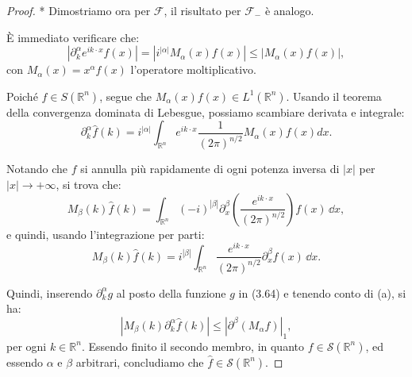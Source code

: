 \begin{proof} *     
Dimostriamo ora per $\mathcal{F}$, il risultato per $\mathcal{F}_{-}$ è analogo.

È immediato verificare che:
\begin{equation*}
    |\partial_k^\alpha e^{i k \cdot x} f(x)| = |i^{|\alpha|} M_\alpha(x) f(x)| \leq |M_\alpha(x) f(x)|,
\end{equation*}
con $M_\alpha(x) = x^\alpha f(x)$ l'operatore moltiplicativo. 

Poiché $f \in S(\mathbb{R}^n)$, segue che $M_\alpha(x) f(x) \in L^1(\mathbb{R}^n)$. Usando il teorema della convergenza dominata di Lebesgue, possiamo scambiare derivata e integrale:
\begin{equation*}
    \partial_k^\alpha \hat{f}(k) = i^{|\alpha|} \int_{\mathbb{R}^n} e^{i k \cdot x} \frac{1}{(2\pi)^{n/2}} M_\alpha(x) f(x) dx.
\end{equation*}


Notando che $f$ si annulla più rapidamente di ogni potenza inversa di $|x|$ per $|x| \to +\infty$, si trova che:
\begin{equation*}
M_{{\beta}}({k}) \hat{f}(k) = \int_{\mathbb{R}^n} (-i)^{|{\beta}|} \partial^{{\beta}}_{{x}} \left( \frac{e^{i{k} \cdot {x}}}{(2\pi)^{n/2}} \right) f({x}) \, \dd {x},
\end{equation*}
e quindi, usando l'integrazione per parti:
\begin{equation*}
M_{{\beta}}({k}) \hat{f}(k) = i^{|{\beta}|} \int_{\mathbb{R}^n} \frac{e^{i{k} \cdot {x}}}{(2\pi)^{n/2}} \partial^{{\beta}}_{{x}} f({x}) \, \dd {x}.
\end{equation*}

Quindi, inserendo $\partial^{{\alpha}}_{{k}} g$ al posto della funzione $g$ in (3.64) e tenendo conto di (a), si ha:
\begin{equation*}
|M_{{\beta}}({k}) \partial^{{\alpha}}_{{k}} \hat{f}(k)| \leq \left| \partial^{{\beta}} (M_{{\alpha}} f) \right|_1,
\end{equation*}
per ogni ${k} \in \mathbb{R}^n$. Essendo finito il secondo membro, in quanto $f \in \mathcal{S}(\mathbb{R}^n)$, ed essendo ${\alpha}$ e ${\beta}$ arbitrari, concludiamo che $\hat{f} \in \mathcal{S}(\mathbb{R}^n)$.


\end{proof}
